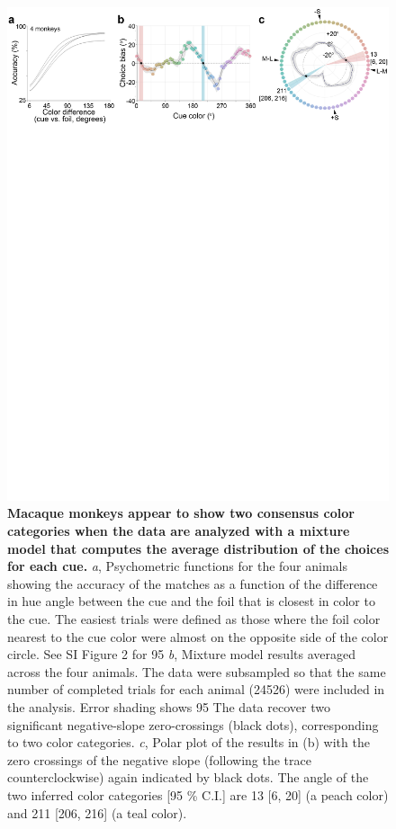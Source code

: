 \begin{figure}
    \begin{fullwidth}
    \centering
    \includegraphics[width=\textwidth+4cm,trim={0 20cm 0 0},clip]{../Figures/flat/F2_CombinedMMResults_5.jpg}
    \caption{\textbf{Macaque monkeys appear to show two consensus color categories when the data are analyzed with a mixture model that computes the average distribution of the choices for each cue.}
	\emph{a}, Psychometric functions for the four animals showing the accuracy of the matches as a function of the difference in hue angle between the cue and the foil that is closest in color to the cue. 
	The easiest trials were defined as those where the foil color nearest to the cue color were almost on the opposite side of the color circle. See SI Figure 2 for 95%
	\emph{b}, Mixture model results averaged across the four animals. The data were subsampled so that the same number of completed trials for each animal (24526) were included in the analysis. Error shading shows 95 %
	The data recover two significant negative-slope zero-crossings (black dots), corresponding to two color categories. 
	\emph{c}, Polar plot of the results in (b) with the zero crossings of the negative slope (following the trace counterclockwise) again indicated by black dots. The angle of the two inferred color categories [95 \% C.I.] are 13 [6, 20] (a peach color) and 211 [206, 216] (a teal color). }
    \label{fig:AvResults}
    \end{fullwidth}
\end{figure}

